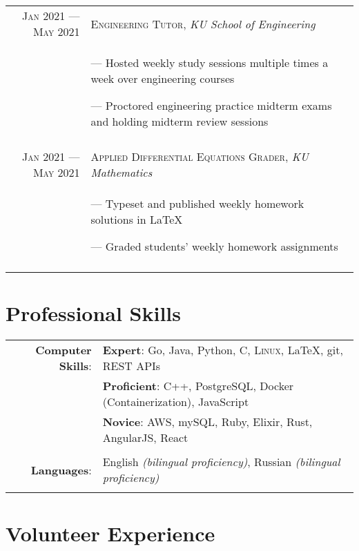 \documentclass[a4paper, 10pt]{article}
\begin{document}
\begin{tabular}{r|p{12cm}}
	\textsc{Jan 2021 --- May 2021} & \textsc{Engineering Tutor}, \emph{KU School of Engineering}           \\&\footnotesize{
		--- Hosted weekly study sessions multiple times a week over engineering courses

		--- Proctored engineering practice midterm exams and holding midterm review sessions
	}                                                                                                      \\\multicolumn{2}{c}{}\\

	\textsc{Jan 2021 --- May 2021} & \textsc{Applied Differential Equations Grader}, \emph{KU Mathematics} \\&\footnotesize{
		--- Typeset and published weekly homework solutions in \LaTeX

		--- Graded students' weekly homework assignments
	}                                                                                                      \\\multicolumn{2}{c}{}\\
\end{tabular}

\section{Professional Skills}

\begin{tabular}{rl}
	\textbf{Computer Skills}: &
	\textbf{Expert}: Go, Java, Python, C, \textsc{Linux}, \LaTeX, git, REST APIs                               \\&
	\textbf{Proficient}: C++, PostgreSQL, Docker (Containerization), JavaScript                                \\&
	\textbf{Novice}: AWS, mySQL, Ruby, Elixir, Rust, AngularJS, React                                          \\\\
	\textbf{Languages}:       & English \emph{(bilingual proficiency)}, Russian \emph{(bilingual proficiency)} \\\\
\end{tabular}

\section{Volunteer Experience}
\end{document}
